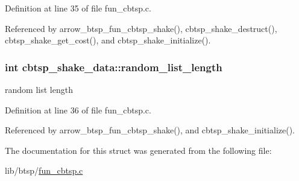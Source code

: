 Definition at line 35 of file fun\_\-cbtsp.c.

Referenced by arrow\_\-btsp\_\-fun\_\-cbtsp\_\-shake(), cbtsp\_\-shake\_\-destruct(), cbtsp\_\-shake\_\-get\_\-cost(), and cbtsp\_\-shake\_\-initialize().\hypertarget{structcbtsp__shake__data_20b4fd190a23a1a0cb3e869716d2af3f}{
\subsubsection{\setlength{\rightskip}{0pt plus 5cm}int {\bf cbtsp\_\-shake\_\-data::random\_\-list\_\-length}}}
\label{structcbtsp__shake__data_20b4fd190a23a1a0cb3e869716d2af3f}


random list length 

Definition at line 36 of file fun\_\-cbtsp.c.

Referenced by arrow\_\-btsp\_\-fun\_\-cbtsp\_\-shake(), and cbtsp\_\-shake\_\-initialize().

The documentation for this struct was generated from the following file:\begin{CompactItemize}
\item 
lib/btsp/\hyperlink{fun__cbtsp_8c}{fun\_\-cbtsp.c}\end{CompactItemize}
